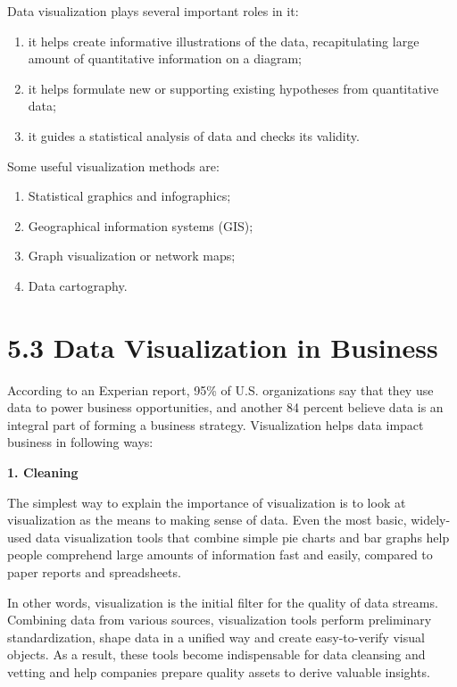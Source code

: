 \documentclass[]{book}
\providecommand{\tightlist}{%
  \setlength{\itemsep}{0pt}\setlength{\parskip}{0pt}}
\theoremstyle{definition}
\theoremstyle{definition}
\theoremstyle{definition}
\theoremstyle{remark}
\begin{document}
Data visualization plays several important roles in it:

\begin{enumerate}
\def\labelenumi{\arabic{enumi}.}
\tightlist
\item
  it helps create informative illustrations of the data, recapitulating
  large amount of quantitative information on a diagram;
\item
  it helps formulate new or supporting existing hypotheses from
  quantitative data;
\item
  it guides a statistical analysis of data and checks its validity.
\end{enumerate}

Some useful visualization methods are:

\begin{enumerate}
\def\labelenumi{\arabic{enumi}.}
\tightlist
\item
  Statistical graphics and infographics;
\item
  Geographical information systems (GIS);
\item
  Graph visualization or network maps;
\item
  Data cartography.
\end{enumerate}

\section{\texorpdfstring{5.3 Data Visualization in
\textbf{Business}}{5.3 Data Visualization in Business}}\label{data-visualization-in-business}

\citep{biz_strategy}

According to an Experian report, 95\% of U.S. organizations say that
they use data to power business opportunities, and another 84 percent
believe data is an integral part of forming a business strategy.
Visualization helps data impact business in following ways:

\textbf{1. Cleaning}

The simplest way to explain the importance of visualization is to look
at visualization as the means to making sense of data. Even the most
basic, widely-used data visualization tools that combine simple pie
charts and bar graphs help people comprehend large amounts of
information fast and easily, compared to paper reports and spreadsheets.

In other words, visualization is the initial filter for the quality of
data streams. Combining data from various sources, visualization tools
perform preliminary standardization, shape data in a unified way and
create easy-to-verify visual objects. As a result, these tools become
indispensable for data cleansing and vetting and help companies prepare
quality assets to derive valuable insights.
\end{document}
